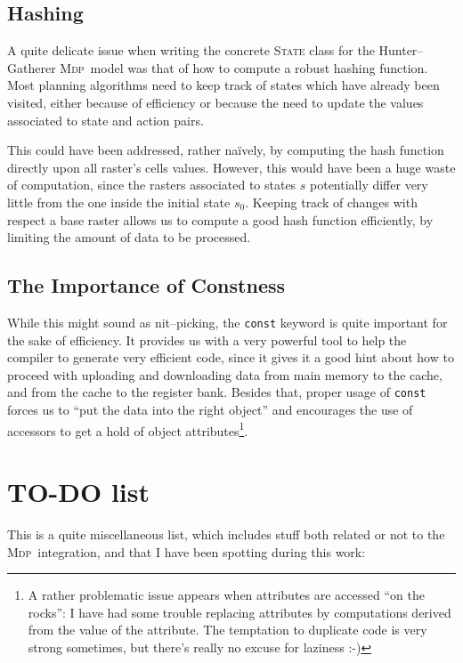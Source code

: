\documentclass[a4paper,10pt]{article}
\newcommand{\mdp}{\textsc{Mdp}}
\begin{document}
\subsection{Hashing}
\label{states_hashing}

A quite delicate issue when writing the concrete \textsc{State} class for the Hunter--Gatherer \mdp~model was that of
how to compute a robust hashing function. Most planning algorithms need to keep track of states which have already
been visited, either because of efficiency or because the need to update the values associated to state and action
pairs.

This could have been addressed, rather naïvely, by computing the hash function directly upon all raster's cells values. However,
this would have been a huge waste of computation, since the rasters associated to states $s$ potentially differ very 
little from the one inside the initial state $s_0$. Keeping track of changes with respect a base raster allows us to compute
a good hash function efficiently, by limiting the amount of data to be processed.

\subsection{The Importance of Constness}
\label{constness}

While this might sound as nit--picking, the \texttt{const} keyword is quite important for the sake of efficiency. It provides
us with a very powerful tool to help the compiler to generate very efficient code, since it gives it a good hint about how to
proceed with uploading and downloading data from main memory to the cache, and from the cache to the register bank. Besides
that, proper usage of \texttt{const} forces us to ``put the data into the right object'' and encourages the use of accessors
to get a hold of object attributes\footnote{A rather problematic issue appears when attributes are accessed ``on the rocks'':
I have had some trouble replacing attributes by computations derived from the value of the attribute. The temptation
to duplicate code is very strong sometimes, but there's really no excuse for laziness :-)}.

\section{TO-DO list}

This is a quite miscellaneous list, which includes stuff both related or not to the \mdp~integration, and that I have been
spotting during this work:
\end{document}

